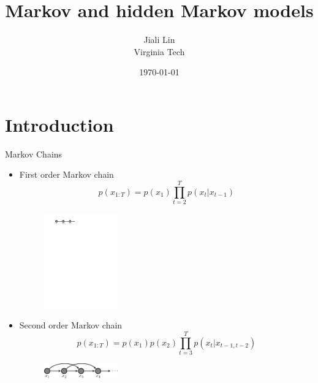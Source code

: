 \documentclass[10pt,mathserif]{beamer}
\title{\large \bfseries Markov and hidden Markov models}
\author{Jiali Lin\\[3ex]
Virginia Tech}
\date{\today}
\begin{document}
\frame{
\thispagestyle{empty}
\titlepage
}

\section{Introduction}
\begin{frame}{Markov Chains}
\begin{itemize}
    \item First order Markov chain
    \begin{equation*}
        p(x_{1:T}) = p(x_1)\prod_{t=2}^Tp(x_t |x_{t-1})
    \end{equation*}
    \begin{figure}[h]
    \centering
    \includegraphics[width=0.3\textwidth]{markovChain1xCropped}
    \end{figure}

    \item Second order Markov chain
    \begin{equation*}
        p(x_{1:T}) = p(x_1)p(x_2)\prod_{t=3}^Tp(x_t |x_{t-1,t-2})
    \end{equation*}
    
    \begin{figure}[h]
    \centering
    \includegraphics[width=0.3\textwidth]{markovChain2}
    \end{figure}
\end{itemize}  
\end{frame}
\end{document}
